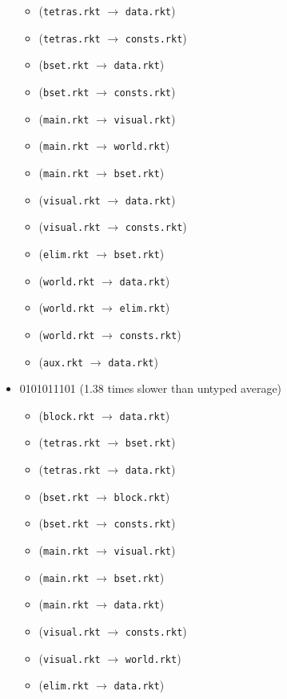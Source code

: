 \documentclass{article}
\newcommand{\mono}[1]{\texttt{#1}}
\begin{document}
\begin{itemize}
\begin{itemize}
  \item (\mono{tetras.rkt} $\rightarrow$ \mono{data.rkt})
  \item (\mono{tetras.rkt} $\rightarrow$ \mono{consts.rkt})
  \item (\mono{bset.rkt} $\rightarrow$ \mono{data.rkt})
  \item (\mono{bset.rkt} $\rightarrow$ \mono{consts.rkt})
  \item (\mono{main.rkt} $\rightarrow$ \mono{visual.rkt})
  \item (\mono{main.rkt} $\rightarrow$ \mono{world.rkt})
  \item (\mono{main.rkt} $\rightarrow$ \mono{bset.rkt})
  \item (\mono{visual.rkt} $\rightarrow$ \mono{data.rkt})
  \item (\mono{visual.rkt} $\rightarrow$ \mono{consts.rkt})
  \item (\mono{elim.rkt} $\rightarrow$ \mono{bset.rkt})
  \item (\mono{world.rkt} $\rightarrow$ \mono{data.rkt})
  \item (\mono{world.rkt} $\rightarrow$ \mono{elim.rkt})
  \item (\mono{world.rkt} $\rightarrow$ \mono{consts.rkt})
  \item (\mono{aux.rkt} $\rightarrow$ \mono{data.rkt})
  \end{itemize}
\item 0101011101 (1.38 times slower than untyped average)
  \begin{itemize}
  \item (\mono{block.rkt} $\rightarrow$ \mono{data.rkt})
  \item (\mono{tetras.rkt} $\rightarrow$ \mono{bset.rkt})
  \item (\mono{tetras.rkt} $\rightarrow$ \mono{data.rkt})
  \item (\mono{bset.rkt} $\rightarrow$ \mono{block.rkt})
  \item (\mono{bset.rkt} $\rightarrow$ \mono{consts.rkt})
  \item (\mono{main.rkt} $\rightarrow$ \mono{visual.rkt})
  \item (\mono{main.rkt} $\rightarrow$ \mono{bset.rkt})
  \item (\mono{main.rkt} $\rightarrow$ \mono{data.rkt})
  \item (\mono{visual.rkt} $\rightarrow$ \mono{consts.rkt})
  \item (\mono{visual.rkt} $\rightarrow$ \mono{world.rkt})
  \item (\mono{elim.rkt} $\rightarrow$ \mono{data.rkt})

\end{itemize}
\end{itemize}
\end{document}
